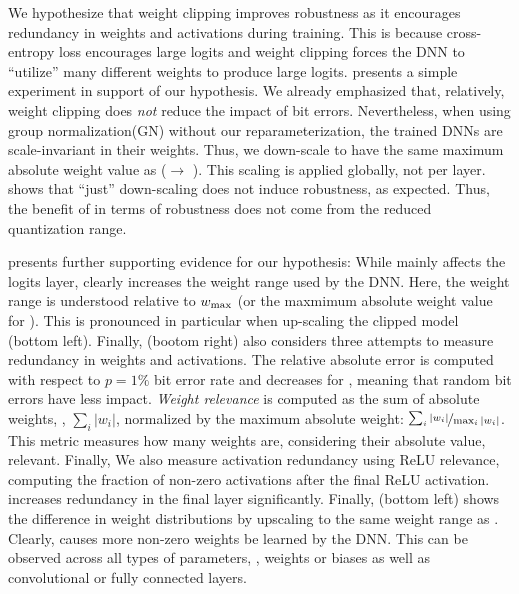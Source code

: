 We hypothesize that weight clipping improves robustness as it encourages redundancy in weights and activations during training. This is because cross-entropy loss encourages large logits and weight clipping forces the DNN to ``utilize'' many different weights to produce large logits.  presents a simple experiment in support of our hypothesis. We already emphasized that, relatively, weight clipping does \emph{not} reduce the impact of bit errors. Nevertheless, when using group normalization(GN) without our reparameterization, the trained DNNs are scale-invariant in their weights. Thus, we down-scale \Normal to have the same maximum absolute weight value as \Clipping[$0.25$] (\Normal $\rightarrow$ \Clipping[$0.25$]).
This scaling is applied globally, not per layer.  shows that ``just'' down-scaling does not induce robustness, as expected. Thus, the benefit of \Clipping in terms of robustness does not come from the reduced quantization range.

 presents further supporting evidence for our hypothesis: While \Random mainly affects the logits layer, \Clipping clearly increases the weight range used by the DNN. Here, the weight range is understood relative to $\wmax$ (or the maxmimum absolute weight value for \Normal). This is pronounced in particular when up-scaling the clipped model (bottom left). Finally,  (bootom right) also considers three attempts to measure redundancy in weights and activations. The relative absolute error is computed with respect to $p = 1\%$ bit error rate and decreases for \Clipping, meaning that random bit errors have less impact. \emph{Weight relevance} is computed as the sum of absolute weights, \ie, $\sum_i |w_i|$, normalized by the maximum absolute weight: $\nicefrac{\sum_i |w_i|}{\max_i |w_i|}$. This metric measures how many weights are, considering their absolute value, relevant. Finally, We also measure activation redundancy using ReLU relevance, computing the fraction of non-zero activations after the final ReLU activation. \Clipping increases redundancy in the final layer significantly. Finally,  (bottom left) shows the difference in weight distributions by upscaling \Clipping[$0.25$] to the same weight range as \Normal. Clearly, \Clipping causes more non-zero weights be learned by the DNN. This can be observed across all types of parameters, \ie, weights or biases as well as convolutional or fully connected layers.

